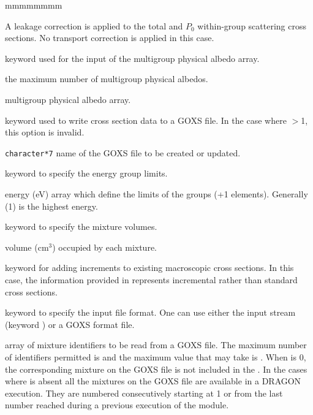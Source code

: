 \begin{ListeDeDescription}{mmmmmmmm}
\item[\moc{LEAK}] A leakage correction is applied to the total and
$P_0$ within-group scattering cross sections. No transport correction is 
applied in this case.

\item[\moc{ALBP}] keyword used for the input of the multigroup physical albedo array.

\item[\dusa{nalbp}] the maximum number of multigroup physical albedos. 

\item[\dusa{albedp}] multigroup physical albedo array. 

\item[\moc{WRIT}] keyword used to write cross section data to a GOXS file. In
the case where $>$1, this option is invalid. 

\item[\dusa{GOXSWN}] {\tt character*7} name of the GOXS file to be created or
updated.

\item[\moc{ENER}] keyword to specify the energy group limits.

\item[\dusa{energy}] energy (eV) array which define the limits of the groups
(+1 elements).  Generally (1) is the highest energy.

\item[\moc{VOLUME}] keyword to specify the mixture volumes.

\item[\dusa{volume}] volume (cm$^3$) occupied by each mixture.

\item[\moc{ADD}] keyword for adding increments to existing macroscopic cross
sections. In this case, the information provided in  represents
incremental rather than standard cross sections. 

\item[\moc{READ}] keyword to specify the input file format. One can use either
the input stream (keyword ) or a GOXS format file. 

\item[\dusa{imat}] array of mixture identifiers to be read from a GOXS file.
The maximum number of identifiers permitted is   and the maximum
value that  may take is . When  is 0, the
corresponding mixture on the GOXS file is not included in the . In the
cases where  is absent all the mixtures on the GOXS file are
available in a DRAGON execution. They are numbered consecutively starting at 1
or from the last number reached during a previous execution of the 
module.


\end{ListeDeDescription}
